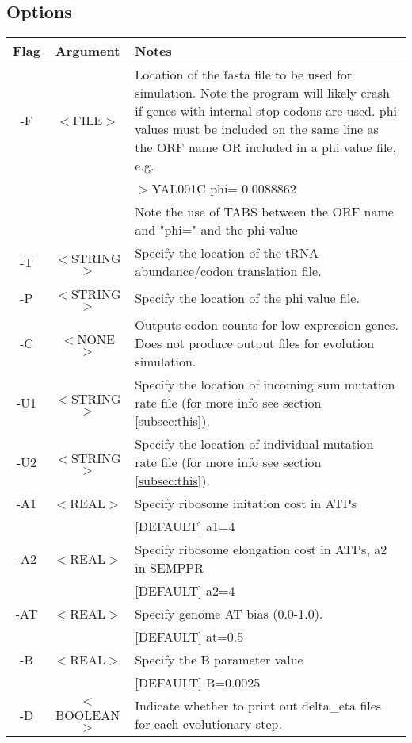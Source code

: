 \documentclass{article}
\begin{document}
	\subsection{Options}
		{\renewcommand{\arraystretch}{1.3}
		 \renewcommand{\tabcolsep}{0.2cm}
		 \begin{tabular}{|c|c|p{10cm}|}
			\hline
			\textbf{Flag} & \textbf{Argument} & \textbf{Notes} \\
			\hline
			-F & $<$FILE$>$ & Location of the fasta file to be used for simulation. Note the program 
			will likely crash if genes with internal stop codons are used.
			phi values must be included on the same line as the ORF name OR included in a phi value file, e.g.\\
			& & 
			$>$YAL001C	phi=	0.0088862 \\
			& & Note the use of TABS between the ORF name and "phi=" and the phi value\\
			\hline
			-T & $<$STRING$>$ & Specify the location of the tRNA abundance/codon 
			translation file.\\
			\hline
			-P & $<$STRING$>$ & Specify the location of the phi value file. \\
			\hline
			-C & $<$NONE$>$ & Outputs codon counts for low expression genes. Does not produce output files for evolution simulation.\\
			\hline
			-U1 & $<$STRING$>$ & Specify the location of incoming sum mutation rate file (for more info see section \ref{subsec:this}).\\
			\hline
			-U2 & $<$STRING$>$ & Specify the location of individual mutation rate file (for more info see section \ref{subsec:this}).\\
			\hline
			-A1 & $<$REAL$>$ & Specify ribosome initation cost in ATPs \\
			& & [DEFAULT] a1=4\\
			\hline
			-A2  & $<$REAL$>$ & Specify ribosome elongation cost in ATPs,  a2 in SEMPPR \\
			& & [DEFAULT] a2=4\\
			\hline
			-AT & $<$REAL$>$ & Specify genome AT bias (0.0-1.0).\\
			& & [DEFAULT] at=0.5		\\
			\hline
			-B & $<$REAL$>$ & Specify the B parameter value\\
			& & [DEFAULT] B=0.0025\\
			\hline
			-D & $<$BOOLEAN$>$ & Indicate whether to print out delta\_eta files for each evolutionary step.

\end{tabular}}
\end{document}
